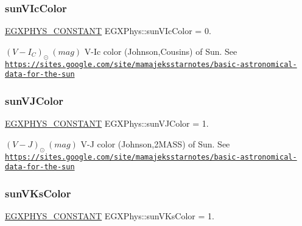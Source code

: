 \subsubsection{\texorpdfstring{sun\+V\+Ic\+Color}{sunVIcColor}}
{\footnotesize\ttfamily \mbox{\hyperlink{group___e_g_x_phys-_constants-_macros_ga76980d288494ce1714c9ac68a95ba702}{E\+G\+X\+P\+H\+Y\+S\+\_\+\+C\+O\+N\+S\+T\+A\+NT}} E\+G\+X\+Phys\+::sun\+V\+Ic\+Color = 0.}

$ (V-I_C)_{\odot} \ (mag)$ V-\/\+Ic color (Johnson,Cousins) of Sun. See \href{https://sites.google.com/site/mamajeksstarnotes/basic-astronomical-data-for-the-sun}{\tt https\+://sites.\+google.\+com/site/mamajeksstarnotes/basic-\/astronomical-\/data-\/for-\/the-\/sun} \mbox{\label{group___e_g_x_phys-_constants-_astrophysics-_solar_system-_sun-_magnitude_ga76071e1fda0a92e07fec7f5d1663c984}} 
\subsubsection{\texorpdfstring{sun\+V\+J\+Color}{sunVJColor}}
{\footnotesize\ttfamily \mbox{\hyperlink{group___e_g_x_phys-_constants-_macros_ga76980d288494ce1714c9ac68a95ba702}{E\+G\+X\+P\+H\+Y\+S\+\_\+\+C\+O\+N\+S\+T\+A\+NT}} E\+G\+X\+Phys\+::sun\+V\+J\+Color = 1.}

$ (V-J)_{\odot} \ (mag)$ V-\/J color (Johnson,2\+M\+A\+SS) of Sun. See \href{https://sites.google.com/site/mamajeksstarnotes/basic-astronomical-data-for-the-sun}{\tt https\+://sites.\+google.\+com/site/mamajeksstarnotes/basic-\/astronomical-\/data-\/for-\/the-\/sun} \mbox{\label{group___e_g_x_phys-_constants-_astrophysics-_solar_system-_sun-_magnitude_ga2980d3d5db06b5c5253e04585311dc72}} 
\subsubsection{\texorpdfstring{sun\+V\+Ks\+Color}{sunVKsColor}}
{\footnotesize\ttfamily \mbox{\hyperlink{group___e_g_x_phys-_constants-_macros_ga76980d288494ce1714c9ac68a95ba702}{E\+G\+X\+P\+H\+Y\+S\+\_\+\+C\+O\+N\+S\+T\+A\+NT}} E\+G\+X\+Phys\+::sun\+V\+Ks\+Color = 1.}

